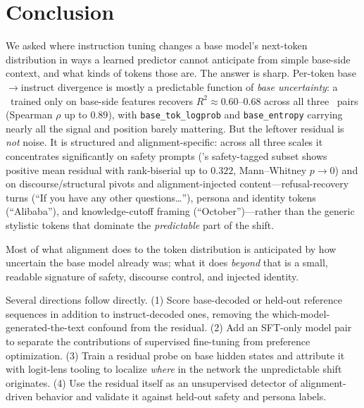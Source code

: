 \section{Conclusion}\label{sec:conclusion}

 We asked where instruction tuning changes a base model's next-token distribution in ways a learned predictor cannot anticipate from simple base-side context, and what kinds of tokens those are. The answer is sharp. Per-token base$\to$instruct divergence is mostly a predictable function of \emph{base uncertainty}: a \gbt\ trained only on base-side features recovers $R^2 \approx 0.60$--$0.68$ across all three \qwen\ pairs (Spearman $\rho$ up to $0.89$), with \texttt{base\_tok\_logprob} and \texttt{base\_entropy} carrying nearly all the signal and position barely mattering. But the leftover residual is \emph{not} noise. It is structured and alignment-specific: across all three scales it concentrates significantly on safety prompts (\justeval's safety-tagged subset shows positive mean residual with rank-biserial up to $0.322$, Mann--Whitney $p \to 0$) and on discourse/structural pivots and alignment-injected content---refusal-recovery turns (\eg ``If you have any other questions\ldots''), persona and identity tokens (``Alibaba''), and knowledge-cutoff framing (``October'')---rather than the generic stylistic tokens that dominate the \emph{predictable} part of the shift.

 Most of what alignment does to the token distribution is anticipated by how uncertain the base model already was; what it does \emph{beyond} that is a small, readable signature of safety, discourse control, and injected identity.

 Several directions follow directly. (1) Score base-decoded or held-out reference sequences in addition to instruct-decoded ones, removing the which-model-generated-the-text confound from the residual. (2) Add an SFT-only model pair to separate the contributions of supervised fine-tuning from preference optimization. (3) Train a residual probe on base hidden states and attribute it with logit-lens tooling \citep{logitlens2025} to localize \emph{where} in the network the unpredictable shift originates. (4) Use the residual itself as an unsupervised detector of alignment-driven behavior and validate it against held-out safety and persona labels.

